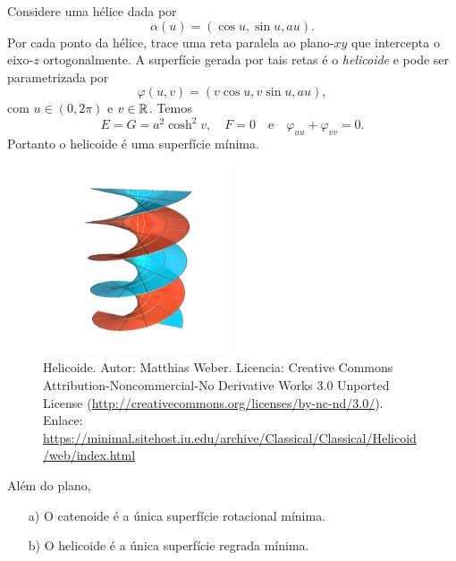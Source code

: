 \begin{exemplo}
	Considere uma hélice dada por
	\begin{equation*}
	\alpha(u) = \left( \cos u, \sin u, au \right).
	\end{equation*}
	Por cada ponto da hélice, trace uma reta paralela ao plano-$xy$ que intercepta o eixo-$z$ ortogonalmente.
	A superfície gerada por tais retas é o \emph{helicoide} e pode ser parametrizada por
	\begin{equation*}
	\varphi(u,v) = \left( v \cos u, v \sin u, au \right),
	\end{equation*}
	com $u \in (0, 2 \pi)$ e $v \in \mathbb{R}$. Temos
	\begin{equation*}
	E = G = a^2 \cosh^2 v, \quad F = 0 \quad \text{e} \quad \varphi_{uu} + \varphi_{vv} = 0.
	\end{equation*}
	Portanto o helicoide é uma superfície mínima.
\end{exemplo}

\begin{figure}
	\centering
	\includegraphics[width=0.5\textwidth]{images/helicoid}
	\caption{Helicoide. Autor: Matthias Weber. Licencia: Creative Commons Attribution-Noncommercial-No Derivative Works 3.0 Unported License (\url{http://creativecommons.org/licenses/by-nc-nd/3.0/}). Enlace: \url{https://minimal.sitehost.iu.edu/archive/Classical/Classical/Helicoid/web/index.html}}
\end{figure}

\begin{teorema}
	Além do plano,
	\begin{enumerate}
		\item[a)] O catenoide é a única superfície rotacional mínima.
		\item[b)] O helicoide é a única superfície regrada mínima.
	\end{enumerate}
\end{teorema}

